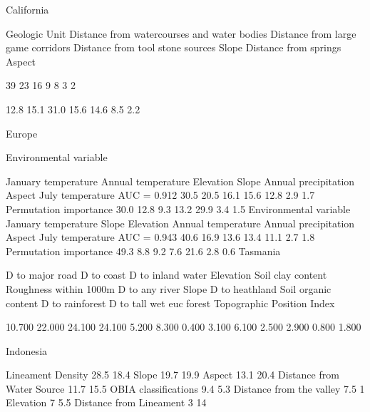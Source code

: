 \cite{oyarzun2016predicting}
California

Geologic Unit
Distance from watercourses and water bodies
Distance from large game corridors
Distance from tool stone sources
Slope
Distance from springs
Aspect

39%
23%
16%
9%
8%
3%
2%

12.8
15.1
31.0
15.6
14.6
8.5
2.2

\cite{kondo2018ecological}
Europe

Environmental variable

January temperature
Annual temperature
Elevation
Slope
Annual precipitation
Aspect
July temperature
AUC = 0.912
30.5
20.5
16.1
15.6
12.8
2.9
1.7
Permutation importance
30.0
12.8
9.3
13.2
29.9
3.4
1.5
Environmental variable
January temperature
Slope
Elevation
Annual temperature
Annual precipitation
Aspect
July temperature
AUC = 0.943
40.6
16.9
13.6
13.4
11.1
2.7
1.8
Permutation importance
49.3
8.8
9.2
7.6
21.6
2.8
0.6
\cite{jones2019mapping}
Tasmania

D to major road
D to coast
D to inland water
Elevation
Soil clay content
Roughness within 1000m
D to any river
Slope
D to heathland
Soil organic content
D to rainforest
D to tall wet euc forest
Topographic Position Index

10.700
22.000
24.100
24.100
5.200
8.300
0.400
3.100
6.100
2.500
2.900
0.800
1.800

\cite{muttaqin2019maxent}
Indonesia

Lineament Density 28.5 18.4
Slope 19.7 19.9 
Aspect 13.1 20.4
Distance from Water Source 11.7 15.5 
OBIA classifications 9.4 5.3
Distance from the valley 7.5 1
Elevation 7 5.5
Distance from Lineament 3 14
